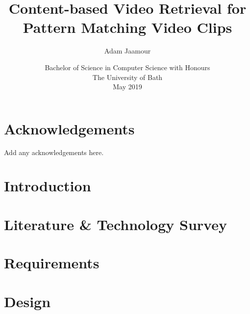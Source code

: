 \documentclass[11pt,openright,twoside,a4paper]{report}
\title{Content-based Video Retrieval for Pattern Matching Video Clips}
\author{Adam Jaamour}
\date{Bachelor of Science in Computer Science with Honours\\The University of Bath\\May 2019}
\begin{document}
\setcounter{page}{0}

\maketitle
\newpage

\newpage

\newpage

\abstract

\newpage

\setcounter{tocdepth}{3}
\tableofcontents
\newpage
\listoffigures
\newpage
\listoftables
\newpage

\chapter*{Acknowledgements}
Add any acknowledgements here.
\newpage


\setcounter{page}{1}

\chapter{Introduction}
\label{ch:chapter1}


\chapter{Literature \& Technology Survey}
\label{ch:chapter2}


\chapter{Requirements}
\label{ch:chapter3}


\chapter{Design}
\label{ch:chapter4}

\end{document}
